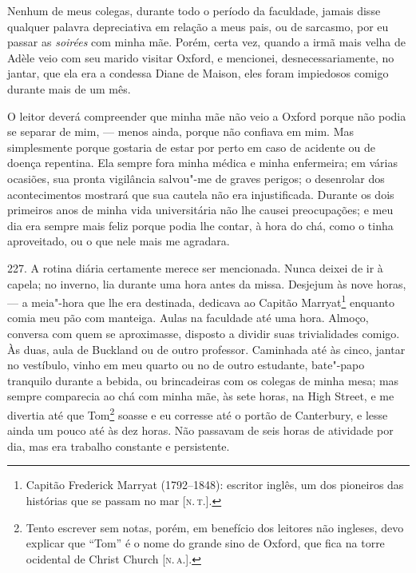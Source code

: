 Nenhum de meus colegas, durante todo o período da faculdade, jamais
disse qualquer palavra depreciativa em relação a meus pais, ou de
sarcasmo, por eu passar as \emph{soirées} com minha mãe. Porém, certa
vez, quando a irmã mais velha de Adèle veio com seu marido visitar
Oxford, e mencionei, desnecessariamente, no jantar, que ela era a
condessa Diane de Maison, eles foram impiedosos comigo durante mais de
um mês.

O leitor deverá compreender que minha mãe não veio a Oxford porque não
podia se separar de mim, --- menos ainda, porque não confiava em mim. Mas
simplesmente porque gostaria de estar por perto em caso de acidente ou
de doença repentina. Ela sempre fora minha médica e minha enfermeira; em
várias ocasiões, sua pronta vigilância salvou"-me de graves perigos; o
desenrolar dos acontecimentos mostrará que sua cautela não era
injustificada. Durante os dois primeiros anos de minha vida
universitária não lhe causei preocupações; e meu dia era sempre mais
feliz porque podia lhe contar, à hora do chá, como o tinha aproveitado,
ou o que nele mais me agradara.

227. A rotina diária certamente merece ser mencionada. Nunca deixei de
ir à capela; no inverno, lia durante uma hora antes da missa. Desjejum
às nove horas, --- a meia"-hora que lhe era destinada, dedicava ao Capitão
Marryat\footnote{Capitão Frederick Marryat (1792--1848): escritor inglês,
  um dos pioneiros das histórias que se passam no mar {[}\textsc{n.\,t.}{]}.}
enquanto comia meu pão com manteiga. Aulas na faculdade até uma hora.
Almoço, conversa com quem se aproximasse, disposto a dividir suas
trivialidades comigo. Às duas, aula de Buckland ou de outro professor.
Caminhada até às cinco, jantar no vestíbulo, vinho em meu quarto ou no
de outro estudante, bate"-papo tranquilo durante a bebida, ou
brincadeiras com os colegas de minha mesa; mas sempre comparecia ao chá
com minha mãe, às sete horas, na High Street, e me divertia até que
Tom\footnote{Tento escrever sem notas, porém, em benefício dos leitores
  não ingleses, devo explicar que ``Tom'' é o nome do grande sino de
  Oxford, que fica na torre ocidental de Christ Church {[}\textsc{n.\,a.}{]}.}
soasse e eu corresse até o portão de Canterbury, e lesse ainda um pouco
até às dez horas. Não passavam de seis horas de atividade por dia, mas
era trabalho constante e persistente.

